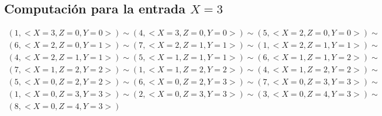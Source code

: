 \documentclass[a4paper]{article}
\begin{document}
		\subsection{Computación para la entrada $X=3$}
		\begin{equation*}\begin{gathered}
		(1, <X=3, Z=0, Y=0>) \sim (4, <X=3, Z=0, Y=0>) \sim (5, <X=2, Z=0, Y=0>) \sim\\
		(6, <X=2, Z=0, Y=1>) \sim (7, <X=2, Z=1, Y=1>) \sim (1, <X=2, Z=1, Y=1>) \sim\\
		(4, <X=2, Z=1, Y=1>) \sim (5, <X=1, Z=1, Y=1>) \sim (6, <X=1, Z=1, Y=2>) \sim\\
		(7, <X=1, Z=2, Y=2>) \sim (1, <X=1, Z=2, Y=2>) \sim (4, <X=1, Z=2, Y=2>) \sim\\
		(5, <X=0, Z=2, Y=2>) \sim (6, <X=0, Z=2, Y=3>) \sim (7, <X=0, Z=3, Y=3>) \sim\\
		(1, <X=0, Z=3, Y=3>) \sim (2, <X=0, Z=3, Y=3>) \sim (3, <X=0, Z=4, Y=3>) \sim\\
		(8, <X=0, Z=4, Y=3>)
		\end{gathered}\end{equation*}
\end{document}
